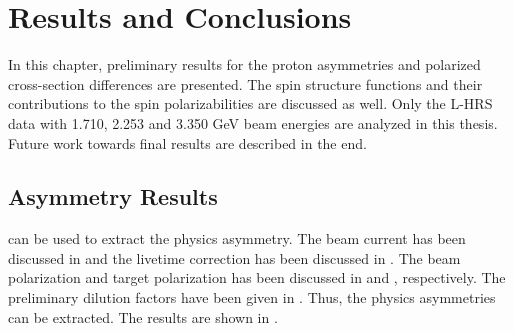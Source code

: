 
\chapter{Results and Conclusions}
\label{C8}

In this chapter, preliminary results for the proton asymmetries and polarized cross-section differences are presented. The spin structure functions and their contributions to the spin polarizabilities are discussed as well. Only the L-HRS data with 1.710, 2.253 and 3.350 GeV beam energies are analyzed in this thesis. Future work towards final results are described in the end.

\section{Asymmetry Results}
\label{C8S1}

 can be used to extract the physics asymmetry. The beam current has been discussed in  and the livetime correction has been discussed in . The beam polarization and target polarization has been discussed in  and , respectively. The preliminary dilution factors have been given in . Thus, the physics asymmetries can be extracted. The results are shown in .

